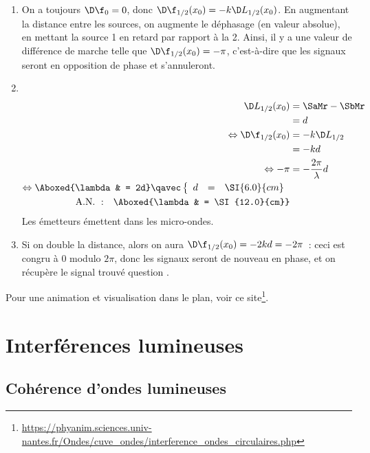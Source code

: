 \documentclass[../../main/main.tex]{subfiles}
\begin{document}
\begin{tcb}[breakable]
{\begin{enumerate}[label=\sqenumi]
			\item On a toujours $\D\f_0 = 0$, donc $\D\f_{1/2}(x_0) = -k\D
				      L_{1/2}(x_0)$. En augmentant la distance entre les sources, on
			      augmente le déphasage (en valeur absolue), en mettant la source 1 en
			      retard par rapport à la 2. Ainsi, il y a une valeur de différence de
			      marche telle que $\D\f_{1/2}(x_0) = -\pi$, c'est-à-dire que les
			      signaux seront en opposition de phase et s'annuleront.
			\item ~
			      \vspace{-24pt}
			      \begin{align*}
				      \D L_{1/2}(x_0) & = \SaMr - \SbMr           \\
				                      & = d                       \\
				      \Leftrightarrow
				      \D\f_{1/2}(x_0) & = -k\D L_{1/2}            \\
				                      & = -kd                     \\
				      \Leftrightarrow
				      -\pi            & = - \frac{2\pi}{\lambda}d \\
				      \Leftrightarrow
				      \Aboxed{\lambda & = 2d}
				      \qavec
				      \left\{
				      \begin{array}{rcl}
					      d & = & \SI{6.0}{cm}
				      \end{array}
				      \right.                                     \\
				      \mathrm{A.N.~:}\quad
				      \Aboxed{\lambda & = \SI{12.0}{cm}}
			      \end{align*}
			      Les émetteurs émettent dans les micro-ondes.
			\item Si on double la distance, alors on aura $\D\f_{1/2}(x_0) = -2kd =
				      -2\pi$~: ceci est congru à 0 modulo $2\pi$, donc les signaux seront
			      de nouveau en phase, et on récupère le signal trouvé question
			      .
		\end{enumerate}
	}
\end{tcb}

\noindent
Pour une animation et visualisation dans le plan, voir ce
site\footnote{\url{https://phyanim.sciences.univ-nantes.fr/Ondes/cuve_ondes/interference_ondes_circulaires.php}}.

\section{Interférences lumineuses}
\subsection{Cohérence d'ondes lumineuses}
\end{document}
